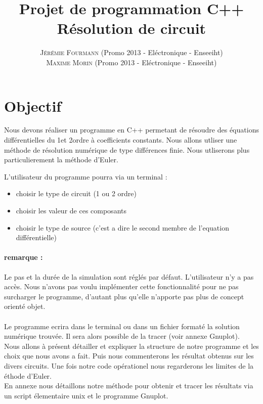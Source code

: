 \documentclass[a4paper,11pt]{article}
\title{\textbf{ \huge{Projet de programmation C++}} \\{\Large  Résolution de circuit}}
\author{
\textsc{Jérémie Fourmann} (Promo 2013 - Eléctronique - Enseeiht)\\ %
\textsc{Maxime Morin} (Promo 2013 - Eléctronique - Enseeiht)\\ %
}
\begin{document}
\pagestyle{plain}

\maketitle
\vspace{1cm}
\renewcommand{\contentsname}{Plan}
\tableofcontents
\vspace{2cm}



\newpage



\section{Objectif}
Nous devons réaliser un programme en C++ permetant de résoudre des équations différentielles du 1\ier et 2\ieme ordre à coefficients constants.
Nous allons utliser une méthode de résolution numérique de type différences finie. Nous utliserons plus particulierement la méthode d'Euler.

L'utilisateur du programme pourra via un terminal :
\begin{itemize}
 \item choisir le type de circuit (1 ou 2 ordre)
 \item choisir les valeur de ces composants
 \item choisir le type de source (c'est a dire le second membre de l'equation différentielle)\\
\end{itemize}

\paragraph{remarque : }Le pas et la durée de la simulation sont réglés par défaut. L'utilisateur n'y a pas accès. Nous n'avons pas voulu implémenter 
cette fonctionnalité pour ne pas surcharger le programme, d'autant plus qu'elle n'apporte pas plus de concept orienté objet. 


\paragraph{}Le programme ecrira dans le terminal ou dans un fichier formaté la solution numérique trouvée. 
Il sera alors possible de la tracer (voir annexe Gnuplot).\\

Nous allons à présent détailler et expliquer la structure de notre programme et les choix que nous avons a fait. Puis nous commenterons les 
résultat obtenus sur les divers circuits. 
Une fois notre code opérationel nous regarderons les limites de la éthode d'Euler.\\
En annexe nous détaillons notre méthode pour obtenir et tracer les résultats via un script élementaire unix et le programme Gnuplot.
\newpage
\end{document}
